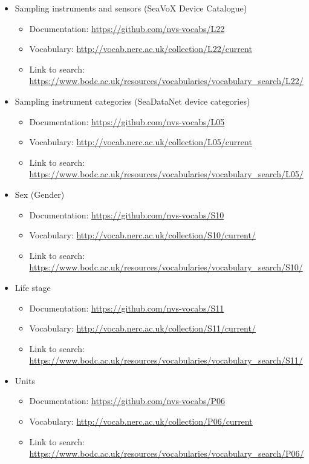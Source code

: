 \documentclass[a4paper,english, 11pt]{article}
\begin{document}
\begin{itemize}
\item Sampling instruments and sensors (SeaVoX Device Catalogue) 
\begin{itemize}
\item Documentation: \url{https://github.com/nvs-vocabs/L22}
\item Vocabulary: \url{http://vocab.nerc.ac.uk/collection/L22/current}
\item Link to search: \url{https://www.bodc.ac.uk/resources/vocabularies/vocabulary_search/L22/}
\end{itemize}

\item Sampling instrument categories (SeaDataNet device categories) 
\begin{itemize}
\item Documentation: \url{https://github.com/nvs-vocabs/L05}
\item Vocabulary: \url{http://vocab.nerc.ac.uk/collection/L05/current}
\item Link to search: \url{https://www.bodc.ac.uk/resources/vocabularies/vocabulary_search/L05/}
\end{itemize}

\item Sex (Gender)
\begin{itemize}
\item Documentation: \url{https://github.com/nvs-vocabs/S10}
\item Vocabulary: \url{http://vocab.nerc.ac.uk/collection/S10/current/}
\item Link to search: \url{https://www.bodc.ac.uk/resources/vocabularies/vocabulary_search/S10/}
\end{itemize}

\item Life stage
\begin{itemize}
\item Documentation: \url{https://github.com/nvs-vocabs/S11}
\item Vocabulary: \url{http://vocab.nerc.ac.uk/collection/S11/current/}
\item Link to search: \url{https://www.bodc.ac.uk/resources/vocabularies/vocabulary_search/S11/}
\end{itemize}

\item Units
\begin{itemize}
\item Documentation: \url{https://github.com/nvs-vocabs/P06}
\item Vocabulary: \url{http://vocab.nerc.ac.uk/collection/P06/current}
\item Link to search: \url{https://www.bodc.ac.uk/resources/vocabularies/vocabulary_search/P06/}
\end{itemize}


\end{itemize}
\end{document}

